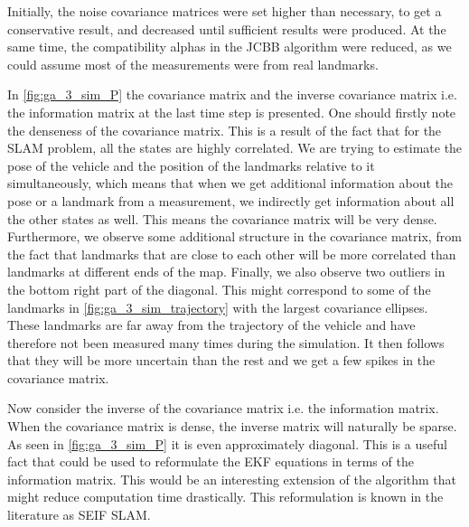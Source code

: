 Initially, the noise covariance matrices were set higher than necessary, to get a conservative result, and decreased until sufficient results were produced. At the same time, the compatibility alphas in the JCBB algorithm were reduced, as we could assume most of the measurements were from real landmarks.



In \cref{fig:ga_3_sim_P} the covariance matrix and the inverse covariance matrix i.e. the information matrix at the last time step is presented. One should firstly note the denseness of the covariance matrix. This is a result of the fact that for the SLAM problem, all the states are highly correlated. We are trying to estimate the pose of the vehicle and the position of the landmarks relative to it simultaneously, which means that when we get additional information about the pose or a landmark from a measurement, we indirectly get information about all the other states as well. This means the covariance matrix will be very dense. Furthermore, we observe some additional structure in the covariance matrix, from the fact that landmarks that are close to each other will be more correlated than landmarks at different ends of the map. Finally, we also observe two outliers in the bottom right part of the diagonal. This might correspond to some of the landmarks in \cref{fig:ga_3_sim_trajectory} with the largest covariance ellipses. These landmarks are far away from the trajectory of the vehicle and have therefore not been measured many times during the simulation. It then follows that they will be more uncertain than the rest and we get a few spikes in the covariance matrix.

Now consider the inverse of the covariance matrix i.e. the information matrix. When the covariance matrix is dense, the inverse matrix will naturally be sparse. As seen in \cref{fig:ga_3_sim_P} it is even approximately diagonal. This is a useful fact that could be used to reformulate the EKF equations in terms of the information matrix. This would be an interesting extension of the algorithm that might reduce computation time drastically. This reformulation is known in the literature as SEIF SLAM. 

